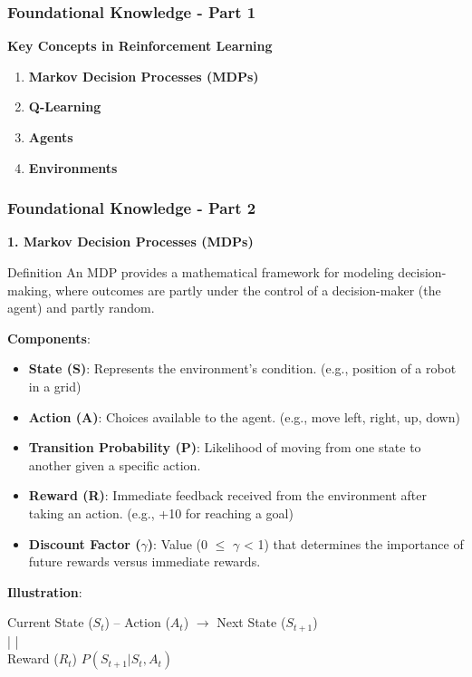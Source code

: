 \documentclass[aspectratio=169]{beamer}
\begin{document}
\begin{frame}[fragile]
    \frametitle{Foundational Knowledge - Part 1}
    \textbf{Key Concepts in Reinforcement Learning}

    \begin{enumerate}
        \item \textbf{Markov Decision Processes (MDPs)}
        \item \textbf{Q-Learning}
        \item \textbf{Agents}
        \item \textbf{Environments}
    \end{enumerate}
\end{frame}

\begin{frame}[fragile]
    \frametitle{Foundational Knowledge - Part 2}
    \textbf{1. Markov Decision Processes (MDPs)}

    \begin{block}{Definition}
        An MDP provides a mathematical framework for modeling decision-making, where outcomes are partly under the control of a decision-maker (the agent) and partly random.
    \end{block}

    \textbf{Components}:
    \begin{itemize}
        \item \textbf{State (S)}: Represents the environment's condition. (e.g., position of a robot in a grid)
        \item \textbf{Action (A)}: Choices available to the agent. (e.g., move left, right, up, down)
        \item \textbf{Transition Probability (P)}: Likelihood of moving from one state to another given a specific action.
        \item \textbf{Reward (R)}: Immediate feedback received from the environment after taking an action. (e.g., +10 for reaching a goal)
        \item \textbf{Discount Factor ($\gamma$)}: Value (0 $\leq$ $\gamma$ < 1) that determines the importance of future rewards versus immediate rewards.
    \end{itemize}

    \textbf{Illustration}:
    \begin{center}
        Current State ($S_t$) -- Action ($A_t$) $\rightarrow$ Next State ($S_{t+1}$)\\
        \hspace{1cm} | \hspace{1cm} |\\
        \hspace{1cm} Reward ($R_t$) \hspace{1cm} $P(S_{t+1}|S_t, A_t)$
    \end{center}
\end{frame}
\end{document}
